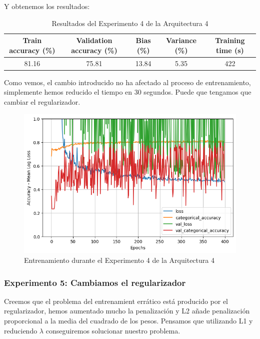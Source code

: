 \documentclass{article}
\begin{document}
			Y obtenemos los resultados:
			\begin{table}[!h]
				\begin{center}
					\begin{tabular}{| c | c | c | c | c |}
						\textbf{Train accuracy (\%)} & \textbf{Validation accuracy (\%)} & \textbf{Bias (\%)} & \textbf{Variance (\%)} & \textbf{Training time (s)} \\ \hline
						81.16 & 75.81 & 13.84 & 5.35 & 422 \\ \hline
					\end{tabular}
					\caption{Resultados del Experimento 4 de la Arquitectura 4}
					\label{tab:res-d-a4-e4}
				\end{center}
			\end{table}
			
			Como vemos, el cambio introducido no ha afectado al proceso de entrenamiento, simplemente hemos reducido el tiempo en 30 segundos. Puede que tengamos que cambiar el regularizador.
			\begin{figure}[!h]
				\begin{center}
					\includegraphics[scale=0.5]{d-tr-a4-e4.png}		
					\caption{Entrenamiento durante el Experimento 4 de la Arquitectura 4}	
					\label{tr-d-a4-e4}
				\end{center}
			\end{figure}
			
		\subsubsection{Experimento 5: Cambiamos el regularizador}
        \label{d-s-a4-e5}
			Creemos que el problema del entrenamient err\'atico est\'a producido por el regularizador, hemos aumentado mucho la penalizaci\'on y L2 a\~nade penalizaci\'on proporcional a la media del cuadrado de los pesos. Pensamos que utilizando L1 y reduciendo $\lambda$ conseguiremos solucionar nuestro problema.
			
\end{document}
